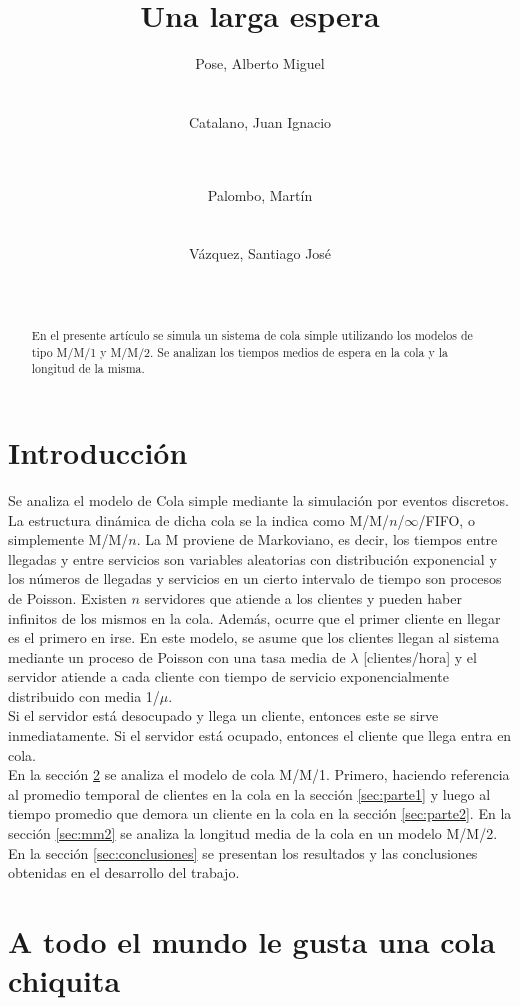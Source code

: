 \documentclass{sig-alternate}
\title{Una larga espera}
\author{
\alignauthor
Pose, Alberto Miguel\\
       \affaddr{Instituto Tecnol\'ogico de Buenos Aires}\\
       \affaddr{Buenos Aires, Argentina}\\
       \email{apose@alu.itba.edu.ar}
\alignauthor
Catalano, Juan Ignacio\\
       \affaddr{Instituto Tecnol\'ogico de Buenos Aires}\\
       \affaddr{Buenos Aires, Argentina}\\
       \email{jcatalan@alu.itba.edu.ar}
\and
\alignauthor 
Palombo, Mart\'in\\
       \affaddr{Instituto Tecnol\'ogico de Buenos Aires}\\
       \affaddr{Buenos Aires, Argentina}\\
       \email{mpalombo@alu.itba.edu.ar}
\alignauthor 
V\'azquez, Santiago Jos\'e\\
       \affaddr{Instituto Tecnol\'ogico de Buenos Aires}\\
       \affaddr{Buenos Aires, Argentina}\\
       \email{savazque@alu.itba.edu.ar}
}
\date{}
\begin{document}
\maketitle

\begin{abstract}

En el presente art\'iculo se simula un sistema de cola simple utilizando los modelos de tipo M/M/1 y M/M/2.
Se analizan los tiempos medios de espera en la cola y la longitud de la misma.
\end{abstract}

\newpage

\section{Introducci\'on}

Se analiza el modelo de Cola simple mediante la simulaci\'on por eventos discretos.
La estructura din\'amica de dicha cola se la indica como M/M/$n$/$\infty$/FIFO, o simplemente M/M/$n$.
La M proviene de Markoviano, es decir, los tiempos entre llegadas y entre servicios son variables
aleatorias con distribuci\'on exponencial y los n\'umeros de llegadas y servicios en un cierto
intervalo de tiempo son procesos de Poisson.  Existen $n$ servidores que atiende a los clientes
y pueden haber infinitos de los mismos en la cola. Adem\'as, ocurre que el primer cliente en llegar es el primero en irse.
En este modelo, se asume que los clientes llegan al sistema mediante un proceso de Poisson con una tasa
media de $\lambda$ [clientes/hora] y el servidor atiende a cada cliente con tiempo de servicio exponencialmente
distribuido con media 1/$\mu$. \\
Si el servidor est\'a desocupado y llega un cliente, entonces este se sirve inmediatamente. Si el servidor est\'a
ocupado, entonces el cliente que llega entra en cola. \\
En la secci\'on \ref{sec:mm1} se analiza el modelo de cola M/M/1. Primero, haciendo referencia al
promedio temporal de clientes en la cola en la secci\'on \ref{sec:parte1} y luego
al tiempo promedio que demora un cliente en la cola en la secci\'on \ref{sec:parte2}.
En la secci\'on \ref{sec:mm2} se analiza la longitud media de la cola en un modelo M/M/2.
En la secci\'on \ref{sec:conclusiones} se presentan los resultados y las conclusiones obtenidas en el desarrollo del trabajo.
\section{A todo el mundo le gusta una cola chiquita}
\label{sec:mm1}
\end{document}

